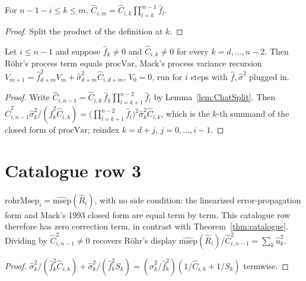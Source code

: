 \begin{lemma}\label{lem:ChatSplit}\leanok
{}
For $n-1-i \le k \le m$, $\hat C_{i,m} = \hat C_{i,k}\prod_{l=k}^{m-1}\hat f_l$.
\end{lemma}
\begin{proof}\leanok Split the product of the definition at $k$. \end{proof}

\begin{theorem}\label{thm:rohrProcess}\leanok
{}
Let $i \le n-1$ and suppose $\hat f_k \neq 0$ and $\hat C_{i,k} \neq 0$ for every
$k = d,\dots,n-2$. Then R\"ohr's process term equals $\mathrm{procVar}$, Mack's process
variance recursion $V_{m+1} = \hat f_{d+m}^2 V_m + \hat\sigma_{d+m}^2 \hat C_{i,d+m}$,
$V_0 = 0$, run for $i$ steps with $\hat f, \hat\sigma^2$ plugged in.
\end{theorem}
\begin{proof}\leanok
Write $\hat C_{i,n-1} = \hat C_{i,k}\,\hat f_k \prod_{l=k+1}^{n-2}\hat f_l$ by
Lemma~\ref{lem:ChatSplit}. Then
$\hat C_{i,n-1}^2 \hat\sigma_k^2/(\hat f_k^2 \hat C_{i,k})
 = \big(\prod_{l=k+1}^{n-2}\hat f_l\big)^2 \hat\sigma_k^2 \hat C_{i,k}$,
which is the $k$-th summand of the closed form of $\mathrm{procVar}$; reindex
$k = d+j$, $j = 0,\dots,i-1$.
\end{proof}

\section{Catalogue row 3}

\begin{theorem}[R\"ohr $=$ Mack 1993]\label{thm:rohrMsep}\leanok
{}
$\mathrm{rohrMsep}_i = \widehat{\mathrm{msep}}(\hat R_i)$, with no side condition: the
linearized error-propagation form and Mack's 1993 closed form are equal term by term. This
catalogue row therefore has zero correction term, in contrast with
Theorem~\ref{thm:catalogue}. Dividing by $\hat C_{i,n-1}^2 \neq 0$ recovers R\"ohr's display
$\widehat{\mathrm{msep}}(\hat R_i)/\hat C_{i,n-1}^2 = \sum_k \hat u_k^2$.
\end{theorem}
\begin{proof}\leanok
$\hat\sigma_k^2/(\hat f_k^2 \hat C_{i,k}) + \hat\sigma_k^2/(\hat f_k^2 S_k)
 = (\hat\sigma_k^2/\hat f_k^2)(1/\hat C_{i,k} + 1/S_k)$ termwise.
\end{proof}

